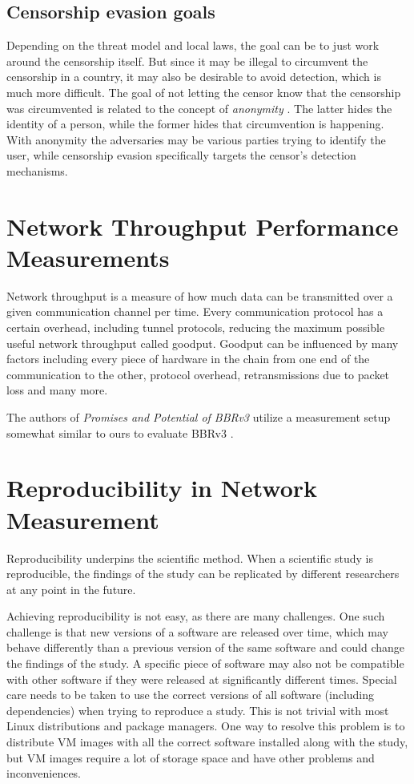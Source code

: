 \subsection{Censorship evasion goals}
Depending on the threat model and local laws, the goal can be to just work around the censorship itself.
But since it may be illegal to circumvent the censorship in a country, it may also be desirable to avoid detection, which is much more difficult. 
The goal of not letting the censor know that the censorship was circumvented is related to the concept of \textit{anonymity} \cite{wiki:Anonymity}.
The latter hides the identity of a person, while the former hides that circumvention is happening.
With anonymity the adversaries may be various parties trying to identify the user, while censorship evasion specifically targets the censor's detection mechanisms.

\section{Network Throughput Performance Measurements}
Network throughput is a measure of how much data can be transmitted over a given communication channel per time.
Every communication protocol has a certain overhead, including tunnel protocols, reducing the maximum possible useful network throughput called goodput.
Goodput can be influenced by many factors including every piece of hardware in the chain from one end of the communication to the other, protocol overhead, retransmissions due to packet loss and many more.

The authors of \textit{Promises and Potential of BBRv3} utilize a measurement setup somewhat similar to ours to evaluate BBRv3 \cite{Promises-and-Potential-of-BBRv3}.

\section{Reproducibility in Network Measurement}
Reproducibility \cite{wiki:Reproducibility} underpins the scientific method.
When a scientific study is reproducible, the findings of the study can be replicated by different researchers at any point in the future.

Achieving reproducibility is not easy, as there are many challenges.
One such challenge is that new versions of a software are released over time, which may behave differently than a previous version of the same software and could change the findings of the study.
A specific piece of software may also not be compatible with other software if they were released at significantly different times.
Special care needs to be taken to use the correct versions of all software (including dependencies) when trying to reproduce a study.
This is not trivial with most Linux distributions and package managers.
One way to resolve this problem is to distribute VM images with all the correct software installed along with the study, but VM images require a lot of storage space and have other problems and inconveniences.

